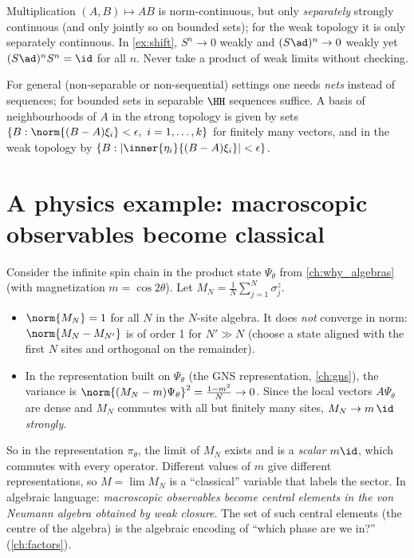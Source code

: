 \begin{whatwrong}
Multiplication $(A,B)\mapsto AB$ is norm-continuous, but only \emph{separately} strongly continuous (and only jointly so on bounded sets); for the weak topology it is only separately continuous. In \cref{ex:shift}, $S^n\to0$ weakly and $(S\ad)^n\to0$ weakly yet $(S\ad)^nS^n=\id$ for all $n$. Never take a product of weak limits without checking.
\end{whatwrong}

For general (non-separable or non-sequential) settings one needs \emph{nets} instead of sequences; for bounded sets in separable $\HH$ sequences suffice. A basis of neighbourhoods of $A$ in the strong topology is given by sets $\{B:\norm{(B-A)\xi_i}<\epsilon,\ i=1,\dots,k\}$ for finitely many vectors, and in the weak topology by $\{B:|\inner{\eta_i}{(B-A)\xi_i}|<\epsilon\}$.

\section{A physics example: macroscopic observables become classical}

Consider the infinite spin chain in the product state $\Psi_\theta$ from \cref{ch:why_algebras} (with magnetization $m=\cos2\theta$). Let $M_N=\frac1N\sum_{j=1}^N\sigma^z_j$.

\begin{itemize}
\item $\norm{M_N}=1$ for all $N$ in the $N$-site algebra. It does \emph{not} converge in norm: $\norm{M_N-M_{N'}}$ is of order 1 for $N'\gg N$ (choose a state aligned with the first $N$ sites and orthogonal on the remainder).
\item In the representation built on $\Psi_\theta$ (the GNS representation, \cref{ch:gns}), the variance is $\norm{(M_N-m)\Psi_\theta}^2=\frac{1-m^2}{N}\to0$. Since the local vectors $A\Psi_\theta$ are dense and $M_N$ commutes with all but finitely many sites, $M_N\to m\,\id$ \emph{strongly}.
\end{itemize}
So in the representation $\pi_\theta$, the limit of $M_N$ exists and is a \emph{scalar} $m\id$, which commutes with every operator. Different values of $m$ give different representations, so $M=\lim M_N$ is a ``classical'' variable that labels the sector. In algebraic language: \emph{macroscopic observables become central elements in the von Neumann algebra obtained by weak closure}. The set of such central elements (the centre of the algebra) is the algebraic encoding of ``which phase are we in?'' (\cref{ch:factors}).

